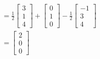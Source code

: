 \documentclass{article}
\begin{document}
\begin{solution}
\begin{align*}
&= \frac{1}{2}
\begin{bmatrix}
3\\
1\\
4
\end{bmatrix}
+
\begin{bmatrix}
0\\
1\\
0
\end{bmatrix}
-\frac{1}{2}
\begin{bmatrix}
-1\\
3\\
4
\end{bmatrix}\\
&=
\begin{bmatrix}
2\\
0\\
0
\end{bmatrix}
\end{align*}
\end{solution}
\end{document}
